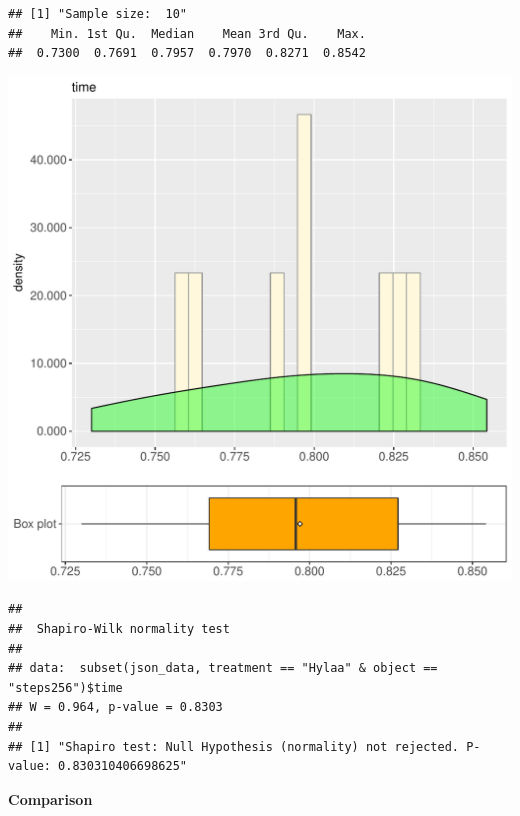 \documentclass{article}\usepackage[]{graphicx}\usepackage[]{color}
\makeatletter
\def\maxwidth{ %
  \ifdim\Gin@nat@width>\linewidth
    \linewidth
  \else
    \Gin@nat@width
  \fi
}
\newenvironment{kframe}{%
 \def\at@end@of@kframe{}%
 \ifinner\ifhmode%
  \def\at@end@of@kframe{\end{minipage}}%
  \begin{minipage}{\columnwidth}%
 \fi\fi%
 \def\FrameCommand##1{\hskip\@totalleftmargin \hskip-\fboxsep
 \colorbox{shadecolor}{##1}\hskip-\fboxsep
     \hskip-\linewidth \hskip-\@totalleftmargin \hskip\columnwidth}%
 \MakeFramed {\advance\hsize-\width
   \@totalleftmargin\z@ \linewidth\hsize
   \@setminipage}}%
 {\par\unskip\endMakeFramed%
 \at@end@of@kframe}
\newenvironment{knitrout}{}{} %
\makeatother
\begin{document}
\begin{knitrout}
\color{fgcolor}\begin{kframe}
\begin{verbatim}
## [1] "Sample size:  10"
##    Min. 1st Qu.  Median    Mean 3rd Qu.    Max. 
##  0.7300  0.7691  0.7957  0.7970  0.8271  0.8542
\end{verbatim}
\end{kframe}
\includegraphics[width=\maxwidth]{figure/RH2_Hylaa_steps256-1} 
\begin{kframe}\begin{verbatim}
## 
## 	Shapiro-Wilk normality test
## 
## data:  subset(json_data, treatment == "Hylaa" & object == "steps256")$time
## W = 0.964, p-value = 0.8303
## 
## [1] "Shapiro test: Null Hypothesis (normality) not rejected. P-value: 0.830310406698625"
\end{verbatim}
\end{kframe}
\end{knitrout}
  
 \textbf{Comparison}
  
\end{document}
